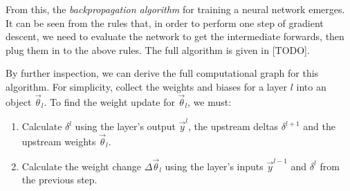 

From this, the \textit{backpropagation algorithm} for training a neural network emerges.
It can be seen from the rules that, in order to perform one step of gradient descent, we need to evaluate the network to get the intermediate forwards, then plug them in to the above rules.
The full algorithm is given in  [TODO].

By further inspection, we can derive the full computational graph for this algorithm.
For simplicity, collect the weights and biases for a layer \(l\) into an object \(\vec{\theta}_l\).
To find the weight update for \(\vec{\theta}_l\), we must:

\begin{enumerate}[topsep=0.2em]
    \item Calculate \(\delta^l\) using the layer's output \(\vec{y}^l\), the upstream deltas \(\delta^{l+1}\) and the upstream weights \(\vec{\theta}_l\).
    \item Calculate the weight change \(\Delta\vec{\theta}_l\) using the layer's inputs \(\vec{y}^{l-1}\) and \(\delta^l\) from the previous step.
\end{enumerate}

